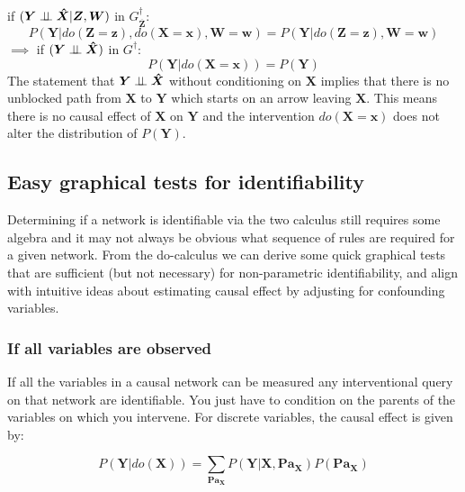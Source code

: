 \documentclass[11pt,a4paper]{article}
\begin{document}
if $(\boldsymbol{Y} \perp\!\!\!\perp \boldsymbol{\hat{X}} |\boldsymbol{Z},\boldsymbol{W})$ in $G^{\dagger}_{\boldsymbol{\overline{Z}}}$:
\begin{equation}
\label{eq:Do3}
P(\boldsymbol{Y}|do(\boldsymbol{Z}=\boldsymbol{z}),do(\boldsymbol{X}=\boldsymbol{x}),\boldsymbol{W}=\boldsymbol{w}) = P(\boldsymbol{Y}|do(\boldsymbol{Z}=\boldsymbol{z}),\boldsymbol{W}=\boldsymbol{w})
\end{equation}
$\implies$ if  $(\boldsymbol{Y} \perp\!\!\!\perp \boldsymbol{\hat{X}})$ in $G^{\dagger}$:
\begin{equation}
\label{eq:Do32}
P(\boldsymbol{Y}|do(\boldsymbol{X}=\boldsymbol{x})) = P(\boldsymbol{Y})
\end{equation}
The statement that $\boldsymbol{Y} \perp\!\!\!\perp \boldsymbol{\hat{X}}$ without conditioning on $\boldsymbol{X}$ implies that there is no unblocked path from $\boldsymbol{X}$ to $\boldsymbol{Y}$ which starts on an arrow leaving $\boldsymbol{X}$. This means there is no causal effect of $\boldsymbol{X}$ on $\boldsymbol{Y}$ and the intervention $do(\boldsymbol{X}=\boldsymbol{x})$ does not alter the distribution of $P(\boldsymbol{Y})$.

\subsection{Easy graphical tests for identifiability}
Determining if a network is identifiable via the two calculus still requires some algebra and it may not always be obvious what sequence of rules are required for a given network. From the do-calculus we can derive some quick graphical tests that are sufficient (but not necessary) for non-parametric identifiability, and align with intuitive ideas about estimating causal effect by adjusting for confounding variables. 

\subsubsection{If all variables are observed}
If all the variables in a causal network can be measured any interventional query on that network are identifiable. You just have to condition on the parents of the variables on which you intervene. For discrete variables, the causal effect is given by:

\begin{equation}
P(\boldsymbol{Y}|do(\boldsymbol{X})) = \sum_{\boldsymbol{Pa_{X}}}{P(\boldsymbol{Y}|\boldsymbol{X},\boldsymbol{Pa_{X}})P(\boldsymbol{Pa_{X}})}
\end{equation}
\end{document}
